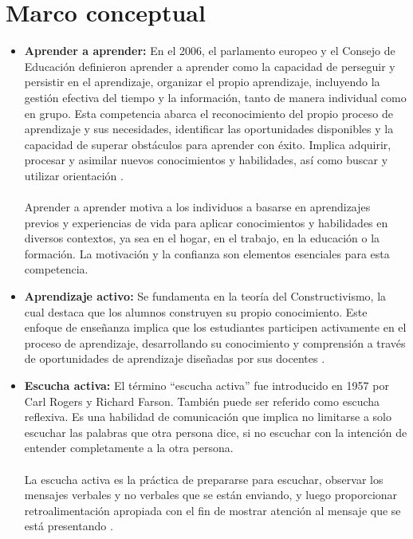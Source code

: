 \section{Marco conceptual}

\begin{itemize}

\item \textbf{Aprender a aprender:} En el 2006, el parlamento europeo y el Consejo de Educación definieron aprender a aprender como la capacidad de perseguir y persistir en el aprendizaje, organizar el propio aprendizaje, incluyendo la gestión efectiva del tiempo y la información, tanto de manera individual como en grupo. Esta competencia abarca el reconocimiento del propio proceso de aprendizaje y sus necesidades, identificar las oportunidades disponibles y la capacidad de superar obstáculos para aprender con éxito. Implica adquirir, procesar y asimilar nuevos conocimientos y habilidades, así como buscar y utilizar orientación \cite{GarciaVazquez2015}.
\\
\\
Aprender a aprender motiva a los individuos a basarse en aprendizajes previos y experiencias de vida para aplicar conocimientos y habilidades en diversos contextos, ya sea en el hogar, en el trabajo, en la educación o la formación. La motivación y la confianza son elementos esenciales para esta competencia.

\item \textbf{Aprendizaje activo:} Se fundamenta en la teoría del Constructivismo, la cual destaca que los alumnos construyen su propio conocimiento. Este enfoque de enseñanza implica que los estudiantes participen activamente en el proceso de aprendizaje, desarrollando su conocimiento y comprensión a través de oportunidades de aprendizaje diseñadas por sus docentes \cite{cambridge2024}.

\item \textbf{Escucha activa:} El término “escucha activa” fue introducido en 1957 por Carl Rogers y Richard Farson. También puede ser referido como escucha reflexiva. Es una habilidad de comunicación que implica no limitarse a solo escuchar las palabras que otra persona dice, si no escuchar con la intención de entender completamente a la otra persona.
\\
\\
La escucha activa es la práctica de prepararse para escuchar, observar los mensajes verbales y no verbales que se están enviando, y luego proporcionar retroalimentación apropiada con el fin de mostrar atención al mensaje que se está presentando \cite{UNIR2024}.


\end{itemize}
